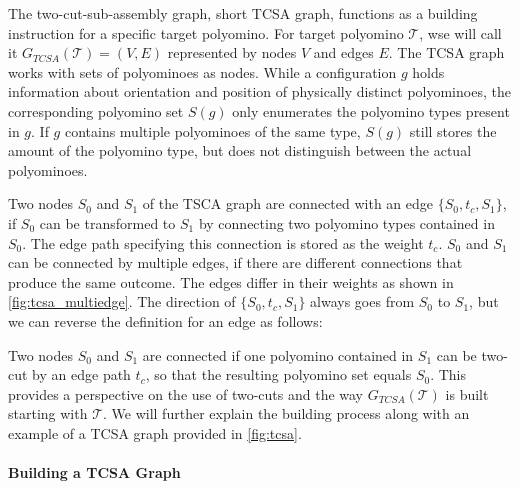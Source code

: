 The two-cut-sub-assembly graph, short TCSA graph, functions as a building instruction for a specific target polyomino.
For target polyomino $\mathcal{T}$, wse will call it $G_{\textit{TCSA}}(\mathcal{T}) = (V,E)$ represented by nodes $V$ and edges $E$.
The TCSA graph works with sets of polyominoes as nodes.
While a configuration $g$ holds information about orientation and position of physically distinct polyominoes, the corresponding polyomino set $S(g)$ only enumerates the polyomino types present in $g$.
If $g$ contains multiple polyominoes of the same type, $S(g)$ still stores the amount of the polyomino type, but does not distinguish between the actual polyominoes.

Two nodes $S_0$ and $S_1$ of the TSCA graph are connected with an edge $\{S_0,t_c,S_1\}$, if $S_0$ can be transformed to $S_1$ by connecting two polyomino types contained in $S_0$.
The edge path specifying this connection is stored as the weight $t_c$.
$S_0$ and $S_1$ can be connected by multiple edges, if there are different connections that produce the same outcome.
The edges differ in their weights as shown in \autoref{fig:tcsa_multiedge}.
The direction of $\{S_0,t_c,S_1\}$ always goes from $S_0$ to $S_1$, but we can reverse the definition for an edge as follows:

Two nodes $S_0$ and $S_1$ are connected if one polyomino contained in $S_1$ can be two-cut by an edge path $t_c$, so that the resulting polyomino set equals $S_0$.
This provides a perspective on the use of two-cuts and the way $G_{\textit{TCSA}}(\mathcal{T})$ is built starting with $\mathcal{T}$.
We will further explain the building process along with an example of a TCSA graph provided in \autoref{fig:tcsa}.


\paragraph{Building a TCSA Graph}

